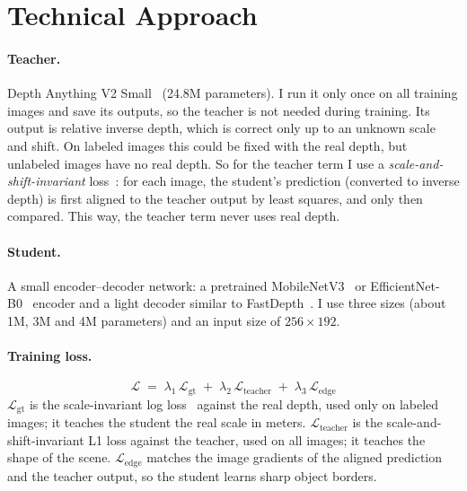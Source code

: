 \documentclass[11pt]{article}
\begin{document}
\section{Technical Approach}

\paragraph{Teacher.} Depth Anything V2 Small~\cite{yang2024dav2} (24.8M
parameters). I run it only once on all training images and save its outputs,
so the teacher is not needed during training. Its output is relative inverse
depth, which is correct only up to an unknown scale and shift. On labeled
images this could be fixed with the real depth, but unlabeled images have no
real depth. So for the teacher term I use a \emph{scale-and-shift-invariant}
loss~\cite{ranftl2022}: for each image, the student's prediction (converted to
inverse depth) is first aligned to the teacher output by least squares, and
only then compared. This way, the teacher term never uses real depth.

\paragraph{Student.} A small encoder--decoder network: a pretrained
MobileNetV3~\cite{howard2019} or EfficientNet-B0~\cite{tan2019} encoder and a
light decoder similar to FastDepth~\cite{wofk2019}. I use three sizes (about
1M, 3M and 4M parameters) and an input size of $256 \times 192$.

\paragraph{Training loss.}
\begin{equation}
  \mathcal{L} \;=\; \lambda_{1}\,\mathcal{L}_{\text{gt}}
  \;+\; \lambda_{2}\,\mathcal{L}_{\text{teacher}}
  \;+\; \lambda_{3}\,\mathcal{L}_{\text{edge}}
\end{equation}
$\mathcal{L}_{\text{gt}}$ is the scale-invariant log loss~\cite{eigen2014}
against the real depth, used only on labeled images; it teaches the student
the real scale in meters. $\mathcal{L}_{\text{teacher}}$ is the
scale-and-shift-invariant L1 loss against the teacher, used on all images; it
teaches the shape of the scene. $\mathcal{L}_{\text{edge}}$ matches the image
gradients of the aligned prediction and the teacher output, so the student
learns sharp object borders.
\end{document}
